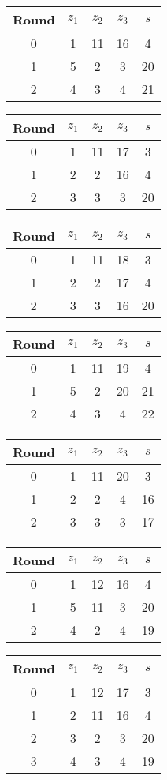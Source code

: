 \begin{multicols}{2}
\begin{tabular}{c | c | c | c | c }
Round & $z_1$ & $z_2$ & $z_3$ & $s$ \\
\hline
0 & 1 & 11 & 16 & 4 \\
1 & 5 & 2 & 3 & 20 \\
2 & 4 & 3 & 4 & 21
\end{tabular}


\begin{tabular}{c | c | c | c | c }
Round & $z_1$ & $z_2$ & $z_3$ & $s$ \\
\hline
0 & 1 & 11 & 17 & 3 \\
1 & 2 & 2 & 16 & 4 \\
2 & 3 & 3 & 3 & 20
\end{tabular}


\begin{tabular}{c | c | c | c | c }
Round & $z_1$ & $z_2$ & $z_3$ & $s$ \\
\hline
0 & 1 & 11 & 18 & 3 \\
1 & 2 & 2 & 17 & 4 \\
2 & 3 & 3 & 16 & 20
\end{tabular}


\begin{tabular}{c | c | c | c | c }
Round & $z_1$ & $z_2$ & $z_3$ & $s$ \\
\hline
0 & 1 & 11 & 19 & 4 \\
1 & 5 & 2 & 20 & 21 \\
2 & 4 & 3 & 4 & 22
\end{tabular}


\begin{tabular}{c | c | c | c | c }
Round & $z_1$ & $z_2$ & $z_3$ & $s$ \\
\hline
0 & 1 & 11 & 20 & 3 \\
1 & 2 & 2 & 4 & 16 \\
2 & 3 & 3 & 3 & 17
\end{tabular}


\begin{tabular}{c | c | c | c | c }
Round & $z_1$ & $z_2$ & $z_3$ & $s$ \\
\hline
0 & 1 & 12 & 16 & 4 \\
1 & 5 & 11 & 3 & 20 \\
2 & 4 & 2 & 4 & 19
\end{tabular}


\begin{tabular}{c | c | c | c | c }
Round & $z_1$ & $z_2$ & $z_3$ & $s$ \\
\hline
0 & 1 & 12 & 17 & 3 \\
1 & 2 & 11 & 16 & 4 \\
2 & 3 & 2 & 3 & 20 \\
3 & 4 & 3 & 4 & 19
\end{tabular}



\end{multicols}
